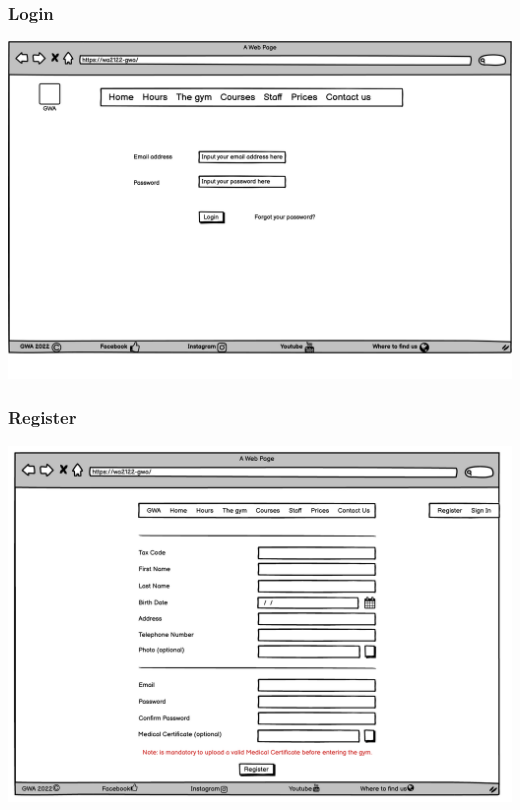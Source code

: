 \subsubsection{Login}
\includegraphics[width=\columnwidth]{InterfaceMockup/Login/Login.png}

\subsubsection{Register}
\includegraphics[width=\columnwidth]{InterfaceMockup/register.pdf}

